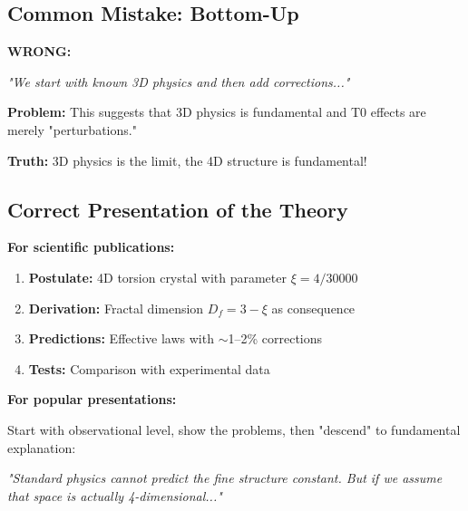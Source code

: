	\subsection{Common Mistake: Bottom-Up}
	
	\begin{warning}
		\textbf{WRONG:}
		
		\textit{"We start with known 3D physics and then add corrections..."}
		
		\vspace{0.3cm}
		
		\textbf{Problem:} This suggests that 3D physics is fundamental and T0 effects are merely "perturbations."
		
		\vspace{0.3cm}
		
		\textbf{Truth:} 3D physics is the limit, the 4D structure is fundamental!
	\end{warning}
	
	\subsection{Correct Presentation of the Theory}
	
	\begin{important}
		\textbf{For scientific publications:}
		
		\begin{enumerate}
			\item \textbf{Postulate:} 4D torsion crystal with parameter $\xi = 4/30000$
			\item \textbf{Derivation:} Fractal dimension $D_f = 3-\xi$ as consequence
			\item \textbf{Predictions:} Effective laws with $\sim$1--2\% corrections
			\item \textbf{Tests:} Comparison with experimental data
		\end{enumerate}
		
		\vspace{0.3cm}
		
		\textbf{For popular presentations:}
		
		Start with observational level, show the problems, then "descend" to fundamental explanation:
		
		\textit{"Standard physics cannot predict the fine structure constant. But if we assume that space is actually 4-dimensional..."}
	\end{important}
	
